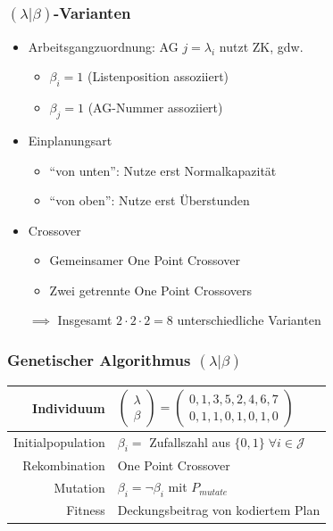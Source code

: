 \begin{frame}
	\frametitle{$(\lambda|\beta)$-Varianten}
	\begin{itemize}
		\item Arbeitsgangzuordnung: AG $j=\lambda_i$ nutzt ZK, gdw.
		\begin{itemize}
			\item $\beta_i=1$ (Listenposition assoziiert)
			\item $\beta_j=1$ (AG-Nummer assoziiert)\\[4mm]
		\end{itemize}
		\item Einplanungsart
		\begin{itemize}
			\item "`von unten"': Nutze erst Normalkapazität
			\item "`von oben"': Nutze erst Überstunden\\[4mm]
		\end{itemize}
		\item Crossover
		\begin{itemize}
			\item Gemeinsamer One Point Crossover
			\item Zwei getrennte One Point Crossovers\\[5mm]
		\end{itemize}
		\item[$\implies$] Insgesamt $2 \cdot 2 \cdot 2 = 8$ unterschiedliche Varianten
	\end{itemize}
\end{frame}

\begin{frame}
	\frametitle{Genetischer Algorithmus $(\lambda|\beta)$}
	\begin{small}
		\begin{center}
			\begin{tabular}{rl}
				\hline 
				Individuum & $\begin{pmatrix}\lambda\\\beta\end{pmatrix}=\begin{pmatrix}0,1,3,5,2,4,6,7\\0,1,1,0,1,0,1,0\end{pmatrix}$\parbox[c][40pt][c]{0pt}{}\tabularnewline
				\hline 
				Initialpopulation & $\beta_i=$ Zufallszahl aus $\{0,1\} \; \forall i \in \mathcal{J}$\tabularnewline
				\hline 
				Rekombination & One Point Crossover\tabularnewline
				\hline 
				Mutation & $\beta_i=\neg \beta_i$ mit $P_{mutate}$\tabularnewline
				\hline 
				Fitness & Deckungsbeitrag von kodiertem Plan\tabularnewline
				\hline 
			\end{tabular}
		\end{center}
	\end{small}
\end{frame}

